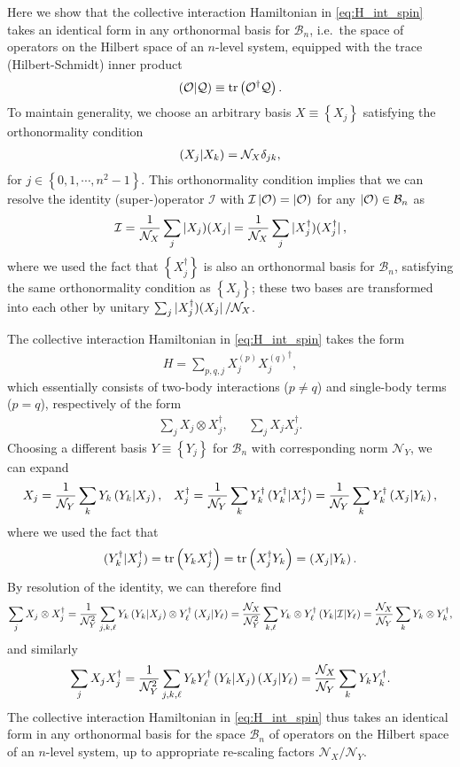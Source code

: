 \documentclass[nofootinbib,notitlepage,11pt]{revtex4-2}
\newcommand{\f}[2]{\dfrac{#1}{#2}} %
\newcommand{\p}[1]{\left(#1\right)} %
\renewcommand{\set}[1]{\left\{#1\right\}} %
\newcommand{\1}{\mathds{1}}
\newcommand{\B}{\mathcal{B}}
\newcommand{\I}{\mathcal{I}}
\newcommand{\N}{\mathcal{N}}
\renewcommand{\O}{\mathcal{O}}
\newcommand{\Q}{\mathcal{Q}}
\def\obra#1{\mathinner{({#1}|}}
\def\oket#1{\mathinner{|{#1})}}
\def\obk#1{\mathinner{({#1})}}
\def\oop#1#2{\oket{#1}\!\obra{#2}}
\begin{document}
Here we show that the collective interaction Hamiltonian in
\eqref{eq:H_int_spin} takes an identical form in any orthonormal basis
for $\B_n$, i.e.~the space of operators on the Hilbert space of an
$n$-level system, equipped with the trace (Hilbert-Schmidt) inner
product
\begin{align}
  \obk{\O|\Q} \equiv \tr\p{\O^\dag \Q}.
\end{align}
To maintain generality, we choose an arbitrary basis
$X\equiv\set{X_j}$ satisfying the orthonormality condition
\begin{align}
  \obk{X_j|X_k} = \N_X \delta_{jk},
\end{align}
for $j\in\set{0,1,\cdots,n^2-1}$.  This orthonormality condition
implies that we can resolve the identity (super-)operator $\I$ with
$\I\oket{\O}=\oket{\O}$ for any $\oket\O\in\B_n$ as
\begin{align}
  \I = \f1{\N_X} \sum_j \oop{X_j}{X_j}
  = \f1{\N_X} \sum_j \oop{X_j^\dag}{X_j^\dag},
\end{align}
where we used the fact that $\set{X_j^\dag}$ is also an orthonormal
basis for $\B_n$, satisfying the same orthonormality condition as
$\set{X_j}$; these two bases are transformed into each other by
unitary $\sum_j\oop{X_j^\dag}{X_j}/\N_X$.

The collective interaction Hamiltonian in \eqref{eq:H_int_spin} takes
the form
\begin{align}
  H = \sum_{p,q,j} X_j^{(p)} {X_j^{(q)}}^\dag,
\end{align}
which essentially consists of two-body interactions ($p\ne q$) and
single-body terms ($p=q$), respectively of the form
\begin{align}
  \sum_j X_j \otimes X_j^\dag,
  &&
  \sum_j X_j X_j^\dag.
\end{align}
Choosing a different basis $Y\equiv\set{Y_j}$ for $\B_n$ with
corresponding norm $\N_Y$, we can expand
\begin{align}
  X_j = \f1{\N_Y} \sum_k Y_k \obk{Y_k|X_j},
  &&
  X_j^\dag = \f1{\N_Y} \sum_k Y_k^\dag \obk{Y_k^\dag|X_j^\dag}
  = \f1{\N_Y} \sum_k Y_k^\dag \obk{X_j|Y_k},
\end{align}
where we used the fact that
\begin{align}
  \obk{Y_k^\dag|X_j^\dag}
  = \tr\p{Y_k X_j^\dag}
  = \tr\p{X_j^\dag Y_k}
  = \obk{X_j|Y_k}.
\end{align}
By resolution of the identity, we can therefore find
\begin{align}
  \sum_j X_j \otimes X_j^\dag
  = \f1{\N_Y^2} \sum_{j,k,\ell} Y_k \obk{Y_k|X_j}
  \otimes Y_\ell^\dag \obk{X_j|Y_\ell}
  = \f{\N_X}{\N_Y^2} \sum_{k,\ell} Y_k \otimes Y_\ell^\dag
  \obk{Y_k|\I|Y_\ell}
  = \f{\N_X}{\N_Y} \sum_k Y_k \otimes Y_k^\dag,
\end{align}
and similarly
\begin{align}
  \sum_j X_j X_j^\dag
  = \f1{\N_Y^2} \sum_{j,k,\ell} Y_k Y_\ell^\dag
  \obk{Y_k|X_j} \obk{X_j|Y_\ell}
  = \f{\N_X}{\N_Y} \sum_k Y_k Y_k^\dag.
\end{align}
The collective interaction Hamiltonian in \eqref{eq:H_int_spin} thus
takes an identical form in any orthonormal basis for the space $\B_n$
of operators on the Hilbert space of an $n$-level system, up to
appropriate re-scaling factors $\N_X/\N_Y$.
\end{document}
